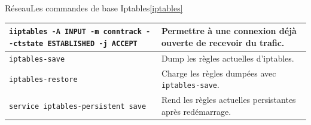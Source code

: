 \documentclass{beamer}
\begin{document}
\begin{frame}{Réseau}{Les commandes de base Iptables\cref{iptables}}
\begin{tiny}
\begin{table}[ht]
\begin{tabular}{|p{8cm}|p{3.5cm}|}
                    \hline
                    \lstinline{iiptables -A INPUT -m conntrack --ctstate ESTABLISHED -j ACCEPT}    & Permettre à une connexion déjà ouverte de recevoir du trafic.        \\
                    \hline
                    \lstinline{iptables-save}                                                      & Dump les règles actuelles d'iptables.                                \\
                    \hline
                    \lstinline{iptables-restore}                                                   & Charge les règles dumpées avec \lstinline{iptables-save}.            \\
                    \hline
                    \lstinline{service iptables-persistent save}                                   & Rend les règles actuelles persistantes après redémarrage.            \\
                    \hline
                \end{tabular}
            \end{table}
        \end{tiny}
    \end{frame}
\end{document}
